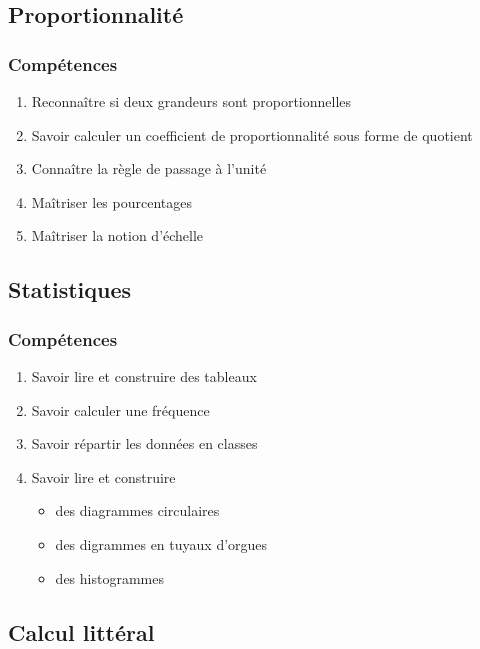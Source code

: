 \subsection{Proportionnalité}\label{ch_5_proba}

\subsubsection*{Compétences}
\begin{enumerate}
	\item Reconnaître si deux grandeurs sont proportionnelles
	\item Savoir calculer un coefficient de proportionnalité sous forme de quotient
	\item Connaître la règle de passage à l'unité
	\item Maîtriser les pourcentages
	\item Maîtriser la notion d'échelle
\end{enumerate}

\subsection{Statistiques}\label{ch_5_stats}

\subsubsection*{Compétences}
 

\begin{enumerate}
	\item Savoir lire et construire des tableaux
	\item Savoir calculer une fréquence
	\item Savoir répartir les données en classes
	\item Savoir lire et construire 
	\begin{itemize}
		\item des diagrammes circulaires
		\item des digrammes en tuyaux d'orgues
		\item des histogrammes
	\end{itemize}

\end{enumerate}

\subsection{Calcul littéral}\label{ch_5_lit}

